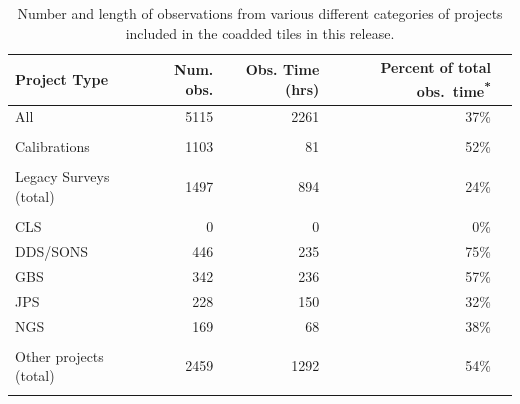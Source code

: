 \documentclass[usenatbib]{mn2e}
\begin{document}
\begin{table}
  \caption{Number and length of observations from various different
    categories of projects included in the coadded tiles in this
    release. \label{tab:obsnum}}
{\centering
\begin{tabular}{l r r r r}
  \hline
  Project Type &
  \multicolumn{1}{p{0.7cm}}{Num. obs.} &
  \multicolumn{1}{p{0.7cm}}{Obs. Time \newline(hrs)} &
  \multicolumn{1}{p{2.0cm}}{%
Percent of total obs.\ time\textsuperscript{*}}\\

  \hline

  All                      & 5115 & 2261 & 37\%   \\\\
  Calibrations             & 1103 &   81 & 52\%   \\\\
  Legacy Surveys (total)   & 1497 &  894 & 24\%   \\\\

  \hspace{0.5cm} CLS       & 0    &    0 &  0\%   \\
  \hspace{0.5cm} DDS/SONS  & 446  &  235 & 75\%   \\
  \hspace{0.5cm} GBS       & 342  &  236 & 57\%   \\
  \hspace{0.5cm} JPS       & 228  &  150 & 32\%   \\
  \hspace{0.5cm} NGS       & 169  &   68 & 38\%   \\\\

  Other projects  (total)  & 2459 & 1292 & 54\%   \\\\


\end{tabular}}
\end{table}
\end{document}
